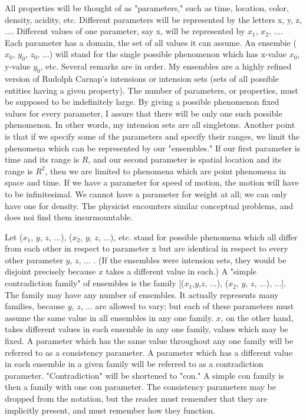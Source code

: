 \documentclass[10pt,twoside,draft]{memoir}
\begin{document}
{{{{All properties will be thought of as "parameters," such as time, 
location, color, density, acidity, etc. Different parameters will be represented 
by the letters x, y, z, .... Different values of one parameter, say x, will be 
represented by $x_1$, $x_2$, .... Each parameter has a domain, the set of all values 
it can assume. An ensembie ($x_0$, $y_0$, $z_0$, ...) will stand for the single possible 
phenomenon which has x-value $x_0$, y-value $y_0$, etc. Several remarks are in 
order. My ensembles are a highly refined version of Rudolph Carnap's 
intensions or intension sets (sets of all possible entities having a given 
property). The number of parameters, or properties, must be supposed to be 
indefinitely large. By giving a possible phenomenon fixed values for every 
parameter, I assure that there will be only one such possible phenomenon. In 
other words, my intension sets are all singletons. Another point is that if we 
specify some of the parameters and specify their ranges, we limit the 
phenomena which can be represented by our "ensembles." If our first 
parameter is time and its range is $R$, and our second parameter is spatial 
location and its range is $R^2$, then we are limited to phenomena which are 
point phenomena in space and time. If we have a parameter for speed of 
motion, the motion will have to be infinitesimal. We cannot have a 
parameter for weight at all; we can only have one for density. The physicist 
encounters similar conceptual problems, and does noi find them 
insurmountable. 

Let ($x_1$, $y$, $z$, ...), ($x_2$, $y$, $z$, ...), etc. stand for possible phenomena 
which all differ from each other in respect to parameter x but are identical in 
respect to every other parameter $y$, $z$, ... . (If the ensembles were intension 
sets, they would be disjoint precisely because $x$ takes a different value in 
each.) A "simple contradiction family" of ensembles is the family [($x_1$,$y$,$z$, 
...), ($x_2$, $y$, $z$, ...), ...]. The family may have any number of ensembles. It 
actually represents many families, because $y$, $z$, ... are allowed to vary; but 
each of these parameters must assume the same value in all ensembles in any 
one family. $x$, on the other hand, takes different values in each ensemble in 
any one family, values which may be fixed. A parameter which has the same 
value throughout any one family will be referred to as a consistency 
parameter. A parameter which has a different value in each ensemble in a 
given family will be referred to as a contradiction parameter. 
"Contradiction" will be shortened to "con." A simple con family is then a 
family with one con parameter. The consistency parameters may be dropped 
from the notation, but the reader must remember that they are implicitly 
present, and must remember how they function. 

}}}}
\end{document}
